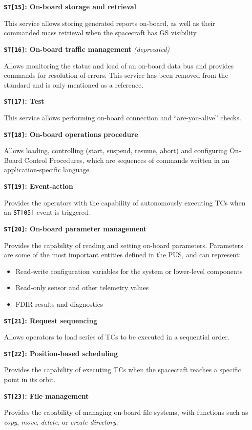 \documentclass[a4paper,nobib,final]{tufte-book}
\begin{document}
\begin{compactitem}
	\item \textbf{\texttt{ST[15]}: On-board storage and retrieval}
	
	This service allows storing generated reports on-board, as well as their commanded mass retrieval when the spacecraft has \acl{GS} visibility.
	
	\item \textbf{\texttt{ST[16]}: On-board traffic management} \emph{(deprecated)}
	
	Allows monitoring the status and load of an on-board data bus and provides commands for resolution of errors. This service has been removed from the standard and is only mentioned as a reference.
	
	\item \textbf{\texttt{ST[17]}: Test}
	
	This service allows performing on-board connection and ``are-you-alive'' checks.
	
	\item \textbf{\texttt{ST[18]}: On-board operations procedure}
	
	Allows loading, controlling (start, suspend, resume, abort) and configuring On-Board Control Procedures, which are sequences of commands written in an application-specific language.
	
	\item \textbf{\texttt{ST[19]}: Event-action}
	
	Provides the operators with the capability of autonomously executing \acp{TC} when an \texttt{ST[05]} event is triggered.
	
	\item \textbf{\texttt{ST[20]}: On-board parameter management}
	
	Provides the capability of reading and setting on-board parameters. Parameters are some of the most important entities defined in the \acs{PUS}, and can represent:
	\begin{itemize}
		\item Read-write configuration variables for the system or lower-level components
		\item Read-only sensor and other telemetry values
		\item \ac{FDIR} results and diagnostics
	\end{itemize}
	
	\item \textbf{\texttt{ST[21]}: Request sequencing}
	
	Allows operators to load series of \acp{TC} to be executed in a sequential order.
	
	\item \textbf{\texttt{ST[22]}: Position-based scheduling}
	
	Provides the capability of executing \acp{TC} when the spacecraft reaches a specific point in its orbit.
	
	\item \textbf{\texttt{ST[23]}: File management}
	
	Provides the capability of managing on-board file systems, with functions such as \emph{copy}, \emph{move}, \emph{delete}, or \emph{create directory}.
\end{compactitem}
\end{document}
